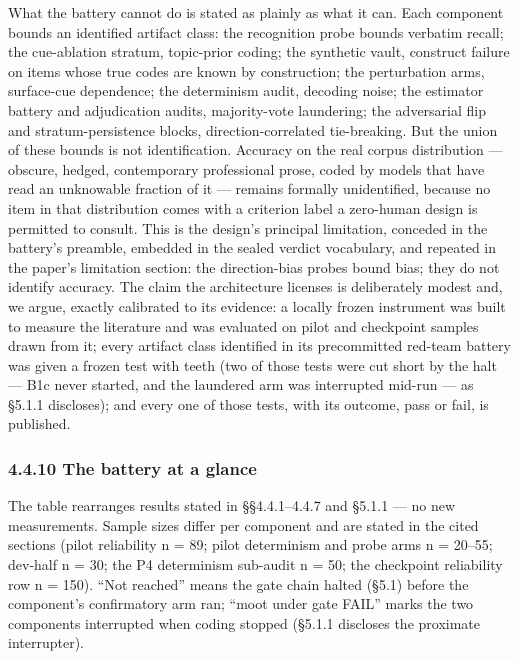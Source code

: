 What the battery cannot do is stated as plainly as what it can. Each component bounds an identified artifact class: the recognition probe bounds verbatim recall; the cue-ablation stratum, topic-prior coding; the synthetic vault, construct failure on items whose true codes are known by construction; the perturbation arms, surface-cue dependence; the determinism audit, decoding noise; the estimator battery and adjudication audits, majority-vote laundering; the adversarial flip and stratum-persistence blocks, direction-correlated tie-breaking. But the union of these bounds is not identification. Accuracy on the real corpus distribution --- obscure, hedged, contemporary professional prose, coded by models that have read an unknowable fraction of it --- remains formally unidentified, because no item in that distribution comes with a criterion label a zero-human design is permitted to consult. This is the design's principal limitation, conceded in the battery's preamble, embedded in the sealed verdict vocabulary, and repeated in the paper's limitation section: the direction-bias probes bound bias; they do not identify accuracy. The claim the architecture licenses is deliberately modest and, we argue, exactly calibrated to its evidence: a locally frozen instrument was built to measure the literature and was evaluated on pilot and checkpoint samples drawn from it; every artifact class identified in its precommitted red-team battery was given a frozen test with teeth (two of those tests were cut short by the halt --- B1c never started, and the laundered arm was interrupted mid-run --- as \S{}5.1.1 discloses); and every one of those tests, with its outcome, pass or fail, is published.

\subsubsection{4.4.10 The battery at a glance}\label{the-battery-at-a-glance}

The table rearranges results stated in \S{}\S{}4.4.1--4.4.7 and \S{}5.1.1 --- no new measurements. Sample sizes differ per component and are stated in the cited sections (pilot reliability n = 89; pilot determinism and probe arms n = 20--55; dev-half n = 30; the P4 determinism sub-audit n = 50; the checkpoint reliability row n = 150). ``Not reached'' means the gate chain halted (\S{}5.1) before the component's confirmatory arm ran; ``moot under gate FAIL'' marks the two components interrupted when coding stopped (\S{}5.1.1 discloses the proximate interrupter).

